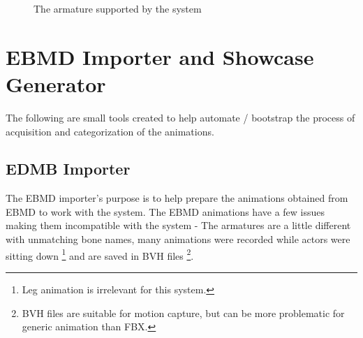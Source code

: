 \begin{figure}[!ht]
\centerline{}
\caption{The armature supported by the system}\label{fig:armature}
\end{figure}


\section{EBMD Importer and Showcase Generator}
The following are small tools created to help automate / bootstrap the process of acquisition and categorization of the animations.


\subsection{EDMB Importer}
The EBMD importer's purpose is to help prepare the animations obtained from EBMD to work with the system. The EBMD animations have a few issues making them incompatible with the system - The armatures are a little different with unmatching bone names, many animations were recorded while actors were sitting down \footnote{Leg animation is irrelevant for this system.} and are saved in BVH files \footnote{BVH files are suitable for motion capture, but can be more problematic for generic animation than FBX.}.

